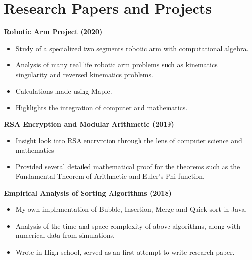 \section{\sc Research Papers and Projects}

{\bf{Robotic Arm Project} (2020)}\\
\begin{itemize}
\setlength\itemsep{0em}
\item Study of a specialized two segments robotic arm with computational algebra.
\item Analysis of many real life robotic arm problems such as kinematics singularity and reversed kinematics problems. 
\item Calculations made using Maple.
\item Highlights the integration of computer and mathematics. 
\end{itemize}

{\bf{RSA Encryption and Modular Arithmetic} (2019)}\\
\begin{itemize}
\setlength\itemsep{0em}
\item Insight look into RSA encryption through the lens of computer science and mathematics
\item Provided several detailed mathematical proof for the theorems such as the Fundamental Theorem of Arithmetic and Euler's Phi function. 
\end{itemize}

{\bf{Empirical Analysis of Sorting Algorithms} (2018)}\\
\begin{itemize}
\setlength\itemsep{0em}
\item My own implementation of Bubble, Insertion, Merge and Quick sort in Java.
\item Analysis of the time and space complexity of above algorithms, along with numerical data from simulations.
\item Wrote in High school, served as an first attempt to write research paper. 
\end{itemize}
\endinput